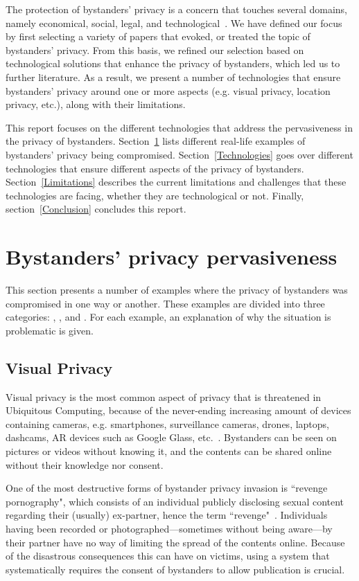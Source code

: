 \documentclass[conference]{IEEEtran}
\begin{document}
The protection of bystanders' privacy is a concern that touches several domains, namely economical, social, legal, and technological~\cite{lu2017privacy}. We have defined our focus by first selecting a variety of papers that evoked, or treated the topic of bystanders' privacy. From this basis, we refined our selection based on technological solutions that enhance the privacy of bystanders, which led us to further literature. As a result, we present a number of technologies that ensure bystanders' privacy around one or more aspects (e.g. visual privacy, location privacy, etc.), along with their limitations.

This report focuses on the different technologies that address the pervasiveness in the privacy of bystanders. Section~\ref{BystandersPrivacy} lists different real-life examples of bystanders' privacy being compromised. Section~\ref{Technologies} goes over different technologies that ensure different aspects of the privacy of bystanders. Section~\ref{Limitations} describes the current limitations and challenges that these technologies are facing, whether they are technological or not. Finally, section~\ref{Conclusion} concludes this report.

\section{Bystanders’ privacy pervasiveness}\label{BystandersPrivacy}
This section presents a number of examples where the privacy of bystanders was compromised in one way or another. These examples are divided into three categories: , , and . For each example, an explanation of why the situation is problematic is given.

\subsection{Visual Privacy}\label{Videos}
Visual privacy is the most common aspect of privacy that is threatened in Ubiquitous Computing, because of the never-ending increasing amount of devices containing cameras, e.g. smartphones, surveillance cameras, drones, laptops, dashcams, \ac{AR} devices such as Google Glass, etc.~\cite{lu2017privacy, yao2017privacy, chinomi2008PriSurv}. Bystanders can be seen on pictures or videos without knowing it, and the contents can be shared online without their knowledge nor consent. 

One of the most destructive forms of bystander privacy invasion is ``revenge pornography", which consists of an individual publicly disclosing sexual content regarding their (usually) ex-partner, hence the term ``revenge"~\cite{olteanu2018consensual}. Individuals having been recorded or photographed---sometimes without being aware---by their partner have no way of limiting the spread of the contents online. Because of the disastrous consequences this can have on victims, using a system that systematically requires the consent of bystanders to allow publication is crucial.
\end{document}
